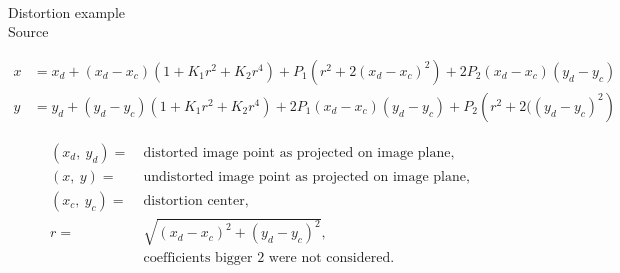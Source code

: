 \documentclass[accentcolor=tud4b,colorbacktitle,inverttitle,landscape,german,presentation,t]{tudbeamer}
\begin{document}
\begin{frame}{\\Distortion example\\ \small{Source \cite{Villiers}}}

 \vspace{-1cm}
 \begin{align*}
 x &=x_d+ (x_d-x_c)(1+K_1r^2+K_2r^4)+P_1\left( r^2+2(x_d-x_c)^2\right) +2P_2(x_d-x_c)(y_d-y_c)\\
 y &= y_d+(y_d-y_c)(1+K_1r^2+K_2r^4)+2P_1(x_d-x_c)(y_d-y_c)+P_2\left(r^2+2((y_d-y_c)^2\right) 
 \end{align*}

\vspace{2cm}
\begin{align*}
(x_d,~y_d) = ~&\text{distorted image point as projected on image plane,}\\
(x,~y) =~&\text{undistorted image point as projected on image plane,}\\
(x_c,~y_c) =~&\text{distortion center,}\\
r =~&\sqrt{(x_d-x_c)^2+(y_d-y_c)^2},\\
 &\text{coefficients bigger $2$ were not considered.}
\end{align*}
\end{frame}
\end{document}
